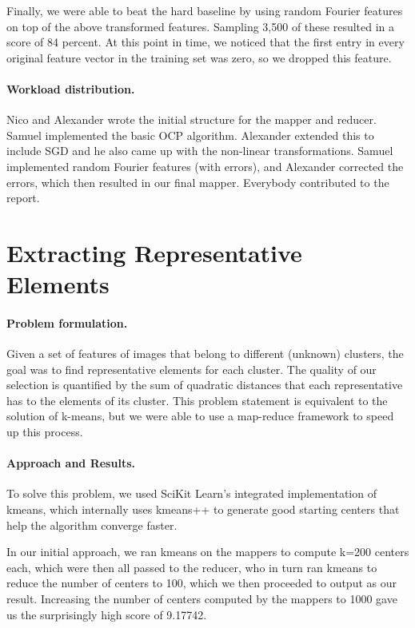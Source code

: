 \documentclass[a4paper,11pt]{article}
\begin{document}
Finally, we were able to beat the hard baseline by using random Fourier features on top of the above transformed features. Sampling 3,500 of these resulted in a score of 84 percent. At this point in time, we noticed that the first entry in every original feature vector in the training set was zero, so we dropped this feature.

\paragraph{Workload distribution.\!\!\!}
Nico and Alexander wrote the initial structure for the mapper and reducer. Samuel implemented the basic OCP algorithm. Alexander extended this to include SGD and he also came up with the non-linear transformations. Samuel implemented random Fourier features (with errors), and Alexander corrected the errors, which then resulted in our final mapper. Everybody contributed to the report.




\newpage
\section{Extracting Representative Elements} 

\paragraph{Problem formulation.\!\!\!}

Given a set of features of images that belong to different (unknown) clusters, the goal was to find representative elements for each cluster. The quality of our selection is quantified by the sum of quadratic distances that each representative has to the elements of its cluster.
This problem statement is equivalent to the solution of k-means, but we were able to use a map-reduce framework to speed up this process.


\paragraph{Approach and Results.\!\!\!}

To solve this problem, we used SciKit Learn's integrated implementation of kmeans, which internally uses kmeans++ to generate good starting centers that help the algorithm converge faster.

In our initial approach, we ran kmeans on the mappers to compute k=200 centers each, which were then all passed to the reducer, who in turn ran kmeans to reduce the number of centers to 100, which we then proceeded to output as our result. Increasing the number of centers computed by the mappers to 1000 gave us the surprisingly high score of 9.17742.
\end{document}
